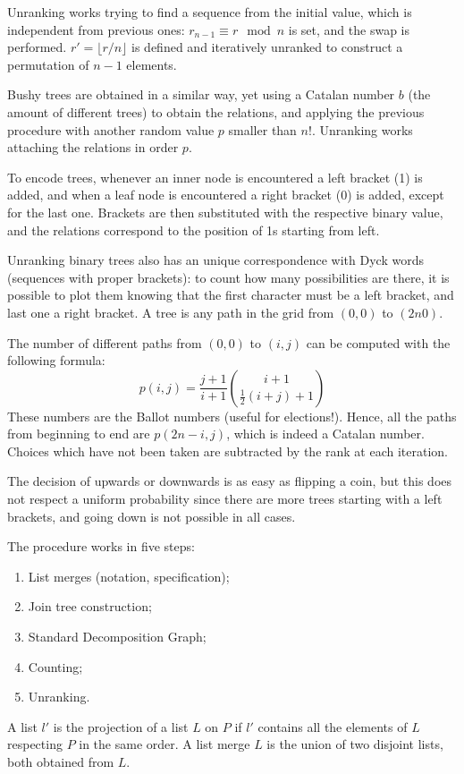 Unranking works trying to find a sequence from the initial value, which is independent from previous ones: $r_{n-1} \equiv r \mod n$ is set, and the swap is performed. $r' = \lfloor r/n\rfloor$ is defined and iteratively unranked to construct a permutation of $n - 1$ elements. 

Bushy trees are obtained in a similar way, yet using a Catalan number $b$ (the amount of different trees) to obtain the relations, and applying the previous procedure with another random value $p$ smaller than $n!$. Unranking works attaching the relations in order $p$.

To encode trees, whenever an inner node is encountered a left bracket (1) is added, and when a leaf node is encountered a right bracket (0) is added, except for the last one. Brackets are then substituted with the respective binary value, and the relations correspond to the position of 1s starting from left. 

Unranking binary trees also has an unique correspondence with Dyck words (sequences with proper brackets): to count how many possibilities are there, it is possible to plot them knowing that the first character must be a left bracket, and last one a right bracket. A tree is any path in the grid from $(0, 0)$ to $(2n 0)$.

The number of different paths from $(0, 0)$ to $(i, j)$ can be computed with the following formula:
$$p(i, j) = \frac{j+1}{i+1} {{i+1}\choose{\frac{1}{2}(i+j)+1}}$$
These numbers are the Ballot numbers (useful for elections!). Hence, all the paths from beginning to end are $p(2n - i, j)$, which is indeed a Catalan number. Choices which have not been taken are subtracted by the rank at each iteration.

The decision of upwards or downwards is as easy as flipping a coin, but this does not respect a uniform probability since there are more trees starting with a left brackets, and going down is not possible in all cases. 

The procedure works in five steps:
\begin{enumerate}
	\item List merges (notation, specification);
	\item Join tree construction;
	\item Standard Decomposition Graph;
	\item Counting;
	\item Unranking.
\end{enumerate}
A list $l'$ is the projection of a list $L$ on $P$ if $l'$ contains all the elements of $L$ respecting $P$ in the same order. A list merge $L$ is the union of two disjoint lists, both obtained from $L$.

